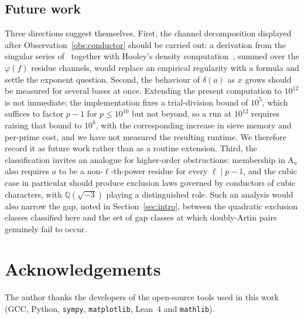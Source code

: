 \documentclass[11pt,reqno]{amsart}
\theoremstyle{plain}
\theoremstyle{definition}
\newcommand{\Art}{\mathrm{A}}
\newcommand{\Q}{\mathbb{Q}}
\begin{document}
\subsection*{Future work}
Three directions suggest themselves. First, the channel decomposition displayed
after Observation~\ref{obs:conductor} should be carried out: a derivation from
the singular series of~\cite{HardyLittlewood1923} together with Hooley's
density computation~\cite{Hooley1967}, summed over the $\varphi(f)$ residue
channels, would replace an empirical regularity with a formula and settle the
exponent question. Second, the behaviour of $\delta(a)$ as $x$ grows should be
measured for several bases at once. Extending the present computation to
$10^{12}$ is not immediate: the implementation fixes a trial-division bound of
$10^5$, which suffices to factor $p - 1$ for $p \le 10^{10}$ but not beyond,
so a run at $10^{12}$ requires raising that bound to $10^6$, with the
corresponding increase in sieve memory and per-prime cost, and we have not
measured the resulting runtime. We therefore record it as future work rather
than as a routine extension. Third, the classification invites an analogue for
higher-order obstructions: membership in $\Art_a$ also requires $a$ to be a
non-$\ell$-th-power residue for every $\ell \mid p-1$, and the cubic case in
particular should produce exclusion laws governed by conductors of cubic
characters, with $\Q(\sqrt{-3})$ playing a distinguished role. Such an
analysis would also narrow the gap, noted in Section~\ref{sec:intro}, between
the quadratic exclusion classes classified here and the set of gap classes at
which doubly-Artin pairs genuinely fail to occur.

\section*{Acknowledgements}
The author thanks the developers of the open-source tools used in this work
(GCC, Python, \texttt{sympy}, \texttt{matplotlib}, Lean~4 and
\texttt{mathlib}).
\end{document}
